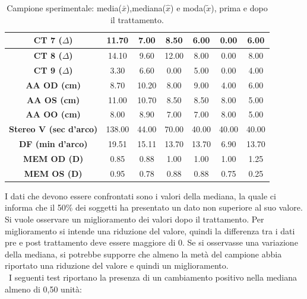 \begin{table}[H]
\begin{center}
\begin{tabular}{|c|c|c|c|c|c|c|}
\textbf{CT 7 ($\Delta$)} & 11.70 & 7.00 & 8.50 & 6.00 & 0.00 & 6.00 \\ \hline
\textbf{CT 8 ($\Delta$)} & 14.10 & 9.60 & 12.00 & 8.00 & 0.00 & 8.00 \\ \hline
\textbf{CT 9 ($\Delta$)} & 3.30 & 6.60 & 0.00 & 5.00 & 0.00 & 4.00 \\ \hline
\textbf{AA OD (cm)} & 8.70 & 10.20 & 8.00 & 9.00 & 4.00 & 6.00 \\ \hline
\textbf{AA OS (cm)} & 11.00 & 10.70 & 8.50 & 8.50 & 8.00 & 5.00 \\ \hline
\textbf{AA OO (cm)} & 8.00 & 8.90 & 7.00 & 7.00 & 8.00 & 5.00\\ \hline
\textbf{Stereo V (sec d'arco)} & 138.00 & 44.00 & 70.00 & 40.00 & 40.00 & 40.00\\ \hline
\textbf{DF (min d'arco)} & 19.51 & 15.11 & 13.70 & 13.70 & 6.90 & 13.70 \\ \hline
\textbf{MEM OD (D)} & 0.85 & 0.88 & 1.00 & 1.00 & 1.00 & 1.25 \\ \hline
\textbf{MEM OS (D)} & 0.95 & 0.78 & 0.88 & 0.88 & 0.75 & 0.25 \\ \hline

\hline
\end{tabular}
\end{center}
\caption[Campione sperimentale: $\bar{x}$), ($\hat{x}$), ($\tilde{x}$, prima e dopo il trattamento]{Campione sperimentale: media($\bar{x}$),mediana($\hat{x}$) e moda($\tilde{x}$), prima e dopo il trattamento.}
\end{table}

I dati che devono essere confrontati sono i valori della mediana, la quale ci informa che il 50\% dei soggetti ha presentato un dato non superiore al suo valore. Si vuole osservare un miglioramento dei valori dopo il trattamento. Per miglioramento si intende una riduzione del valore, quindi la differenza tra i dati pre e post trattamento deve essere maggiore di 0. Se si osservasse una variazione della mediana, si potrebbe supporre che almeno la metà del campione abbia riportato una riduzione del valore e quindi un miglioramento. 
\\\
I seguenti test riportano la presenza di un cambiamento positivo nella mediana almeno di 0,50 unità:

